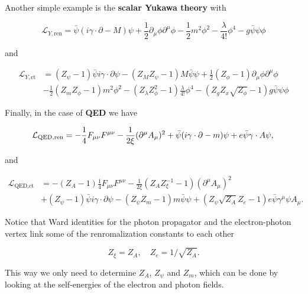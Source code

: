 \documentclass[../FeynCalcManual.tex]{subfiles}
\begin{document}
Another simple example is the \textbf{scalar Yukawa theory} with

\begin{equation}
\mathcal{L}_{Y,{\textrm{ren}}} = \bar{\psi} (i \gamma \cdot \partial - M) \psi + \frac{1}{2} \partial_\mu \phi \partial^\mu \phi - \frac{1}{2} m^2 \phi^2 - \frac{\lambda}{4!} \phi^4 - g \bar{\psi} \psi \phi
\end{equation}

and

\begin{align*}
\mathcal{L}_{Y,{\textrm{ct}}} &= (Z_\psi - 1) \bar{\psi} i \gamma \cdot \partial \psi - (Z_M Z_\psi - 1) M \bar{\psi} \psi + \frac{1}{2} (Z_\phi - 1) \partial_\mu \phi \partial^\mu \phi \\
&- \frac{1}{2} (Z_m Z_\phi -1) m^2 \phi^2 -  (Z_\lambda Z_\phi^2 -1) \frac{\lambda}{4!} \phi^4 - (Z_g Z_x \sqrt{Z_\phi} -1) g \bar{\psi} \psi \phi
\end{align*}

Finally, in the case of \textbf{QED} we have

\begin{equation}
  \mathcal{L}_{\textrm{QED},\textrm{ren}} = -\frac{1}{4} F_{\mu \nu}F^{\mu \nu} - \frac{1}{2 \xi}(\partial^\mu A_\mu)^2 +
  \bar{\psi} (i \gamma \cdot \partial -m) \psi + e  \bar{\psi} \gamma \cdot A \psi ,\\
\end{equation}

and

\begin{align*}
  \mathcal{L}_{\textrm{QED},\textrm{ct}}  & = - (Z_A-1) \frac{1}{4}F_{\mu \nu}F^{\mu \nu} - \frac{1}{2\xi} (Z_A Z^{-1}_\xi - 1) (\partial^\mu A_\mu)^2 \nonumber \\
    & + (Z_\psi-1) \bar{\psi} i \gamma \cdot \partial \psi- (Z_\psi Z_m -1) m \bar{\psi} \psi + (Z_\psi \sqrt{Z_A} Z_e -1) e \bar{\psi} \gamma^\mu \psi A_\mu.
\end{align*}

Notice that Ward identities for the photon propagator and the
electron-photon vertex link some of the renromalization constants to
each other

\begin{equation}
Z_\xi = Z_A, \quad Z_e = 1/\sqrt{Z_A}.
\end{equation}

This way we only need to determine \(Z_A\), \(Z_\psi\) and \(Z_m\),
which can be done by looking at the self-energies of the electron and
photon fields.
\end{document}
